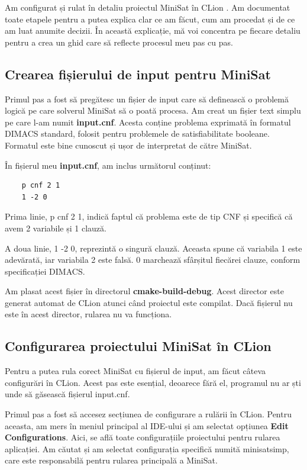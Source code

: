 \documentclass[runningheads]{llncs}
\begin{document}
Am configurat și rulat în detaliu proiectul MiniSat în CLion\cite{clionmanual} . Am documentat toate etapele pentru a putea explica clar ce am făcut, cum am procedat și de ce am luat anumite decizii. În această explicație, mă voi concentra pe fiecare detaliu pentru a crea un ghid care să reflecte procesul meu pas cu pas.
\subsection{Crearea fișierului de input pentru MiniSat}

Primul pas a fost să pregătesc un fișier de input care să definească o problemă logică pe care solverul MiniSat să o poată procesa. Am creat un fișier text simplu pe care l-am numit \textbf{input.cnf}. Acesta conține problema exprimată în formatul DIMACS standard, folosit pentru problemele de satisfiabilitate booleane. Formatul este bine cunoscut și ușor de interpretat de către MiniSat.

În fișierul meu \textbf{input.cnf}, am inclus următorul conținut:

\begin{verbatim}
    p cnf 2 1
    1 -2 0
\end{verbatim}

Prima linie, p cnf 2 1, indică faptul că problema este de tip CNF și specifică că avem 2 variabile și 1 clauză.

A doua linie, 1 -2 0, reprezintă o singură clauză. Aceasta spune că variabila 1 este adevărată, iar variabila 2 este falsă. 0 marchează sfârșitul fiecărei clauze, conform specificației DIMACS.

Am plasat acest fișier în directorul \textbf{cmake-build-debug}. Acest director este generat automat de CLion atunci când proiectul este compilat. Dacă fișierul nu este în acest director, rularea nu va funcționa.

\subsection{Configurarea proiectului MiniSat în CLion}

Pentru a putea rula corect MiniSat cu fișierul de input, am făcut câteva configurări în CLion. Acest pas este esențial, deoarece fără el, programul nu ar ști unde să găsească fișierul input.cnf.

Primul pas a fost să accesez secțiunea de configurare a rulării în CLion. Pentru aceasta, am mers în meniul principal al IDE-ului și am selectat opțiunea \textbf{Edit Configurations}. Aici, se află toate configurațiile proiectului pentru rularea aplicației. Am căutat și am selectat configurația specifică numită minisat\underline{}simp, care este responsabilă pentru rularea principală a MiniSat.
\end{document}
